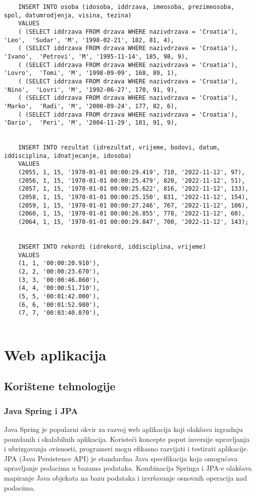 \documentclass[times, utf8, zavrsni]{fer}
\begin{document}
\begin{lstlisting}
    INSERT INTO osoba (idosoba, iddrzava, imeosoba, prezimeosoba, spol, datumrodjenja, visina, tezina)
    VALUES 
    ( (SELECT iddrzava FROM drzava WHERE nazivdrzava = 'Croatia'), 'Leo',  'Sudar', 'M', '1998-02-21', 182, 81, 4),
    ( (SELECT iddrzava FROM drzava WHERE nazivdrzava = 'Croatia'), 'Ivano',  'Petrovi', 'M', '1995-11-14', 185, 98, 9),
    ( (SELECT iddrzava FROM drzava WHERE nazivdrzava = 'Croatia'), 'Lovro',  'Tomi', 'M', '1998-09-09', 168, 89, 1),
    ( (SELECT iddrzava FROM drzava WHERE nazivdrzava = 'Croatia'), 'Nino',  'Lovri', 'M', '1992-06-27', 170, 91, 9),
    ( (SELECT iddrzava FROM drzava WHERE nazivdrzava = 'Croatia'), 'Marko',  'Radi', 'M', '2000-09-24', 177, 82, 6),
    ( (SELECT iddrzava FROM drzava WHERE nazivdrzava = 'Croatia'), 'Dario',  'Peri', 'M', '2004-11-29', 181, 91, 9),


    INSERT INTO rezultat (idrezultat, vrijeme, bodovi, datum, iddisciplina, idnatjecanje, idosoba)
    VALUES 
    (2055, 1, 15, '1970-01-01 00:00:29.419', 710, '2022-11-12', 97),
    (2056, 1, 15, '1970-01-01 00:00:25.479', 820, '2022-11-12', 51),
    (2057, 1, 15, '1970-01-01 00:00:25.622', 816, '2022-11-12', 133),
    (2058, 1, 15, '1970-01-01 00:00:25.150', 831, '2022-11-12', 154),
    (2059, 1, 15, '1970-01-01 00:00:27.246', 767, '2022-11-12', 106),
    (2060, 1, 15, '1970-01-01 00:00:26.855', 778, '2022-11-12', 60),
    (2064, 1, 15, '1970-01-01 00:00:29.847', 700, '2022-11-12', 143);


    INSERT INTO rekordi (idrekord, iddisciplina, vrijeme)
    VALUES
    (1, 1, '00:00:20.910'),
    (2, 2, '00:00:23.670'),
    (3, 3, '00:00:46.860'),
    (4, 4, '00:00:51.710'),
    (5, 5, '00:01:42.000'),  
    (6, 6, '00:01:52.980'),
    (7, 7, '00:03:40.070'),


\end{lstlisting}

\chapter{Web aplikacija}

\section{Korištene tehnologije}

\subsection{Java Spring i JPA}
Java Spring je popularni okvir za razvoj web aplikacija koji olakšava izgradnju pouzdanih i skalabilnih aplikacija. 
Koristeći koncepte poput inversije upravljanja i ubrizgavanja ovisnosti, programeri mogu efikasno razvijati i testirati aplikacije. 
JPA (Java Persistence API) je standardna Java specifikacija koja omogućava upravljanje podacima u bazama podataka. 
Kombinacija Springa i JPA-e olakšava mapiranje Java objekata na bazu podataka i izvršavanje osnovnih operacija nad podacima.
\end{document}
